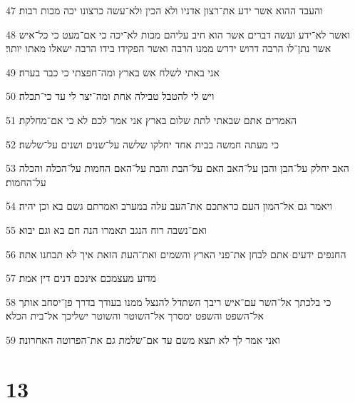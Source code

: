 \par 47 והעבד ההוא אשר ידע את־רצון אדניו ולא הכין ולא־עשה כרצונו יכה מכות רבות׃
\par 48 ואשר לא־ידע ועשה דברים אשר הוא חיב עליהם מכות לא־יכה כי אם־מעט כי כל־איש אשר נתן־לו הרבה דרוש ידרש ממנו הרבה ואשר הפקידו בידו הרבה ישאלו מאתו יותר׃
\par 49 אני באתי לשלח אש בארץ ומה־חפצתי כי כבר בערה׃
\par 50 ויש לי להטבל טבילה אחת ומה־יצר לי עד כי־תכלה׃
\par 51 האמרים אתם שבאתי לתת שלום בארץ אני אמר לכם לא כי אם־מחלקת׃
\par 52 כי מעתה חמשה בבית אחד יחלקו שלשה על־שנים ושנים על־שלשה׃
\par 53 האב יחלק על־הבן והבן על־האב האם על־הבת והבת על־האם החמות על־הכלה והכלה על־החמות׃
\par 54 ויאמר גם אל־המון העם כראתכם את־העב עלה במערב ואמרתם גשם בא וכן יהיה׃
\par 55 ואם־נשבה רוח הנגב תאמרו הנה חם בא וגם יבוא׃
\par 56 החנפים ידעים אתם לבחן את־פני הארץ והשמים ואת־העת הזאת איך לא תבחנו אתה׃
\par 57 מדוע מעצמכם אינכם דנים דין אמת׃
\par 58 כי בלכתך אל־השר עם־איש ריבך השתדל להנצל ממנו בעודך בדרך פן־יסחב אותך אל־השפט והשפט ימסרך אל־השוטר והשוטר ישליכך אל־בית הכלא׃
\par 59 ואני אמר לך לא תצא משם עד אם־שלמת גם את־הפרוטה האחרונה׃

\chapter{13}

